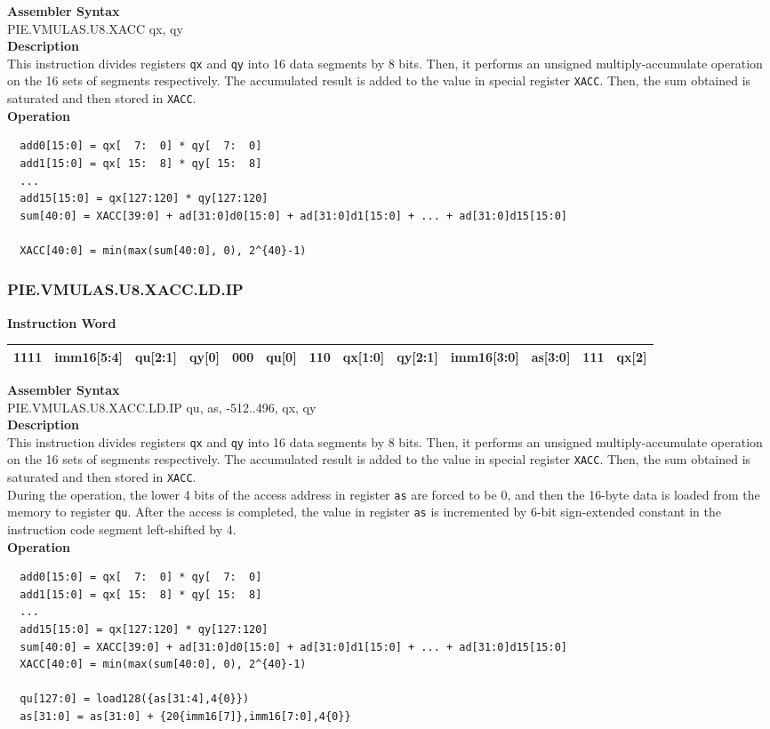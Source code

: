 \textbf{Assembler Syntax} \\
PIE.VMULAS.U8.XACC qx, qy \\
\textbf{Description} \\
This instruction divides registers \lstinline{qx} and \lstinline{qy} into 16 data segments by 8 bits. Then, it performs an unsigned multiply-accumulate operation on the 16 sets of segments respectively. The accumulated result is added to the value in special register \lstinline{XACC}. Then, the sum obtained is saturated and then stored in \lstinline{XACC}.\\
\textbf{Operation}
\begin{lstlisting}
  add0[15:0] = qx[  7:  0] * qy[  7:  0]
  add1[15:0] = qx[ 15:  8] * qy[ 15:  8]
  ...
  add15[15:0] = qx[127:120] * qy[127:120]
  sum[40:0] = XACC[39:0] + ad[31:0]d0[15:0] + ad[31:0]d1[15:0] + ... + ad[31:0]d15[15:0]

  XACC[40:0] = min(max(sum[40:0], 0), 2^{40}-1)
\end{lstlisting}

\newpage
\subsubsection{PIE.VMULAS.U8.XACC.LD.IP}\label{instruction:PIEVMULASU8XACCLDIP}
\setlength\tabcolsep{6pt}
\textbf{Instruction Word} \\
\begin{tabular}{|c|c|c|c|c|c|c|c|c|c|c|c|c|}
	\hline
	1111 & imm16[5:4] & qu[2:1] & qy[0] & 000 & qu[0] & 110 & qx[1:0] & qy[2:1] & imm16[3:0] & as[3:0] & 111 & qx[2] \\
	\hline
\end{tabular}

\textbf{Assembler Syntax} \\
PIE.VMULAS.U8.XACC.LD.IP qu, as, -512..496, qx, qy \\
\textbf{Description} \\
This instruction divides registers \lstinline{qx} and \lstinline{qy} into 16 data segments by 8 bits. Then, it performs an unsigned multiply-accumulate operation on the 16 sets of segments respectively. The accumulated result is added to the value in special register \lstinline{XACC}. Then, the sum obtained is saturated and then stored in \lstinline{XACC}. \\ During the operation, the lower 4 bits of the access address in register \lstinline{as} are forced to be 0, and then the 16-byte data is loaded from the memory to register \lstinline{qu}. After the access is completed, the value in register \lstinline{as} is incremented by 6-bit sign-extended constant in the instruction code segment left-shifted by 4.\\
\textbf{Operation}
\begin{lstlisting}
  add0[15:0] = qx[  7:  0] * qy[  7:  0]
  add1[15:0] = qx[ 15:  8] * qy[ 15:  8]
  ...
  add15[15:0] = qx[127:120] * qy[127:120]
  sum[40:0] = XACC[39:0] + ad[31:0]d0[15:0] + ad[31:0]d1[15:0] + ... + ad[31:0]d15[15:0]
  XACC[40:0] = min(max(sum[40:0], 0), 2^{40}-1)

  qu[127:0] = load128({as[31:4],4{0}})
  as[31:0] = as[31:0] + {20{imm16[7]},imm16[7:0],4{0}}
\end{lstlisting}

